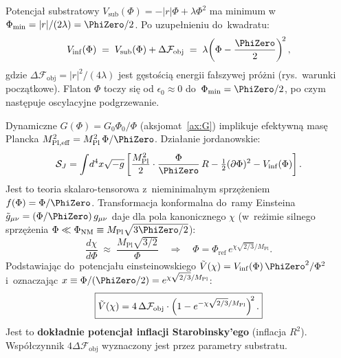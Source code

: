 Potencja\l{} substratowy $V_\mathrm{sub}(\Phi) = -|r|\Phi + \lambda\Phi^2$
ma minimum w~$\Phi_\mathrm{min} = |r|/(2\lambda) = \PhiZero/2$.
Po uzupe\l{}nieniu do~kwadratu:
\begin{equation}\label{eq:Vinf-quadratic}
    V_\mathrm{inf}(\Phi)
    \;=\; V_\mathrm{sub}(\Phi) + \Delta\mathcal{F}_\mathrm{obj}
    \;=\; \lambda\!\left(\Phi - \frac{\PhiZero}{2}\right)^{\!2},
\end{equation}
gdzie $\Delta\mathcal{F}_\mathrm{obj} = |r|^2/(4\lambda)$ jest g\k{e}sto\'sci\k{a}
energii fa\l{}szywej pr\'o\.zni (rys.~warunki pocz\k{a}tkowe).
Flaton $\Phi$ toczy si\k{e} od $\epsilon_0 \approx 0$ do~$\Phi_\mathrm{min} = \PhiZero/2$,
po czym nast\k{e}puje oscylacyjne podgrzewanie.

Dynamiczne $G(\Phi) = G_0\Phi_0/\Phi$ (aksjomat~\ref{ax:G}) implikuje
efektywn\k{a} mas\k{e} Plancka $M_\mathrm{Pl,eff}^2 = M_\mathrm{Pl}^2\,\Phi/\PhiZero$.
Dzia\l{}anie jordanowskie:
\begin{equation}\label{eq:action-jordan}
    \mathcal{S}_J = \int\!d^4x\sqrt{-g}
    \left[\frac{M_\mathrm{Pl}^2}{2}\cdot\frac{\Phi}{\PhiZero}\,R
          - \tfrac{1}{2}(\partial\Phi)^2 - V_\mathrm{inf}(\Phi)\right].
\end{equation}
Jest to teoria skalaro-tensorowa z~nieminimalnym sprz\k{e}\.zeniem
$f(\Phi) = \Phi/\PhiZero$. Transformacja konformalna do~ramy Einsteina
$\tilde{g}_{\mu\nu} = (\Phi/\PhiZero)\,g_{\mu\nu}$ daje dla pola
kanonicznego $\chi$ (w~re\.zimie silnego sprz\k{e}\.zenia
$\Phi \ll \Phi_\mathrm{NM} \equiv M_\mathrm{Pl}\sqrt{3\PhiZero/2}$):
\begin{equation}\label{eq:chi-of-Phi}
    \frac{d\chi}{d\Phi} \;\approx\; \frac{M_\mathrm{Pl}\sqrt{3/2}}{\Phi}
    \quad\Rightarrow\quad
    \Phi = \Phi_\mathrm{ref}\,e^{\chi\sqrt{2/3}/M_\mathrm{Pl}}.
\end{equation}
Podstawiaj\k{a}c do~potencja\l{}u einsteinowskiego
$\tilde{V}(\chi) = V_\mathrm{inf}(\Phi)\,\PhiZero^2/\Phi^2$ i~oznaczaj\k{a}c
$x \equiv \Phi/(\PhiZero/2) = e^{\chi\sqrt{2/3}/M_\mathrm{Pl}}$:
\begin{equation}\label{eq:Vtilde-Starobinsky}
    \boxed{%
    \tilde{V}(\chi)
    = 4\,\Delta\mathcal{F}_\mathrm{obj}\cdot
      \left(1 - e^{-\chi\sqrt{2/3}/M_\mathrm{Pl}}\right)^{\!2}.}
\end{equation}
Jest to \textbf{dok\l{}adnie potencja\l{} inflacji Starobinsky'ego}
(inflacja $R^2$). Wsp\'o\l{}czynnik $4\Delta\mathcal{F}_\mathrm{obj}$
wyznaczony jest przez parametry substratu.

